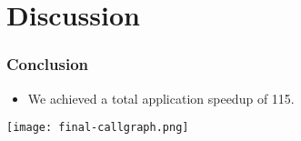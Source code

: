 \section{Discussion}

\begin{frame}
  \frametitle{Conclusion}
    \begin{itemize}
        \item We achieved a total application speedup of 115.
        \end{itemize}  
    \begin{center}
        \texttt{[image: final-callgraph.png]}
    \end{center}
\end{frame}

